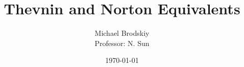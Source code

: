 


\title{Thevnin and Norton Equivalents}
\date{\today}
\author{Michael Brodskiy\\ \small Professor: N. Sun}



\maketitle

